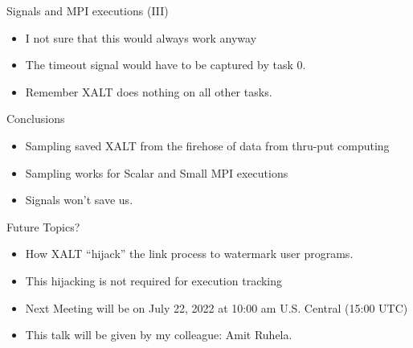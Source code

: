 \documentclass{beamer}
\begin{document}
\begin{frame}{Signals and MPI executions (III)}
  \begin{itemize}
    \item I not sure that this would always work anyway
    \item The timeout signal would have to be captured by task 0.
    \item Remember XALT does nothing on all other tasks.
  \end{itemize}
\end{frame}


\begin{frame}{Conclusions}
  \begin{itemize}
    \item Sampling saved XALT from the firehose of data from thru-put computing
    \item Sampling works for Scalar and Small MPI executions
    \item Signals won't save us.
  \end{itemize}
\end{frame}


\begin{frame}{Future Topics?}
  \begin{itemize}
    \item How XALT ``hijack'' the link process to watermark user
      programs.
    \item This hijacking is not required for execution tracking
    \item Next Meeting will be on July 22, 2022 at 10:00 am
      U.S. Central (15:00 UTC)
    \item This talk will be given by my colleague: Amit Ruhela.
  \end{itemize}
\end{frame}

%
\end{document}
